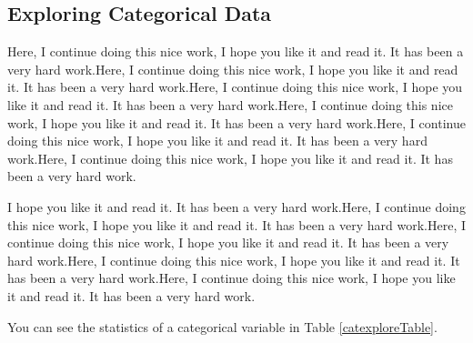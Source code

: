 \documentclass[a4paper, 12pt]{article}
\begin{document}


\subsection{Exploring Categorical Data}\label{catexplor}

Here, I continue doing this nice work, I hope you like it and read it. It has been a very hard work.Here, I continue doing this nice work, I hope you like it and read it. It has been a very hard work.Here, I continue doing this nice work, I hope you like it and read it. It has been a very hard work.Here, I continue doing this nice work, I hope you like it and read it. It has been a very hard work.Here, I continue doing this nice work, I hope you like it and read it. It has been a very hard work.Here, I continue doing this nice work, I hope you like it and read it. It has been a very hard work.

I hope you like it and read it. It has been a very hard work.Here, I continue doing this nice work, I hope you like it and read it. It has been a very hard work.Here, I continue doing this nice work, I hope you like it and read it. It has been a very hard work.Here, I continue doing this nice work, I hope you like it and read it. It has been a very hard work.Here, I continue doing this nice work, I hope you like it and read it. It has been a very hard work.

You can see the statistics of a categorical variable in Table \ref{catexploreTable}.

\end{document}
